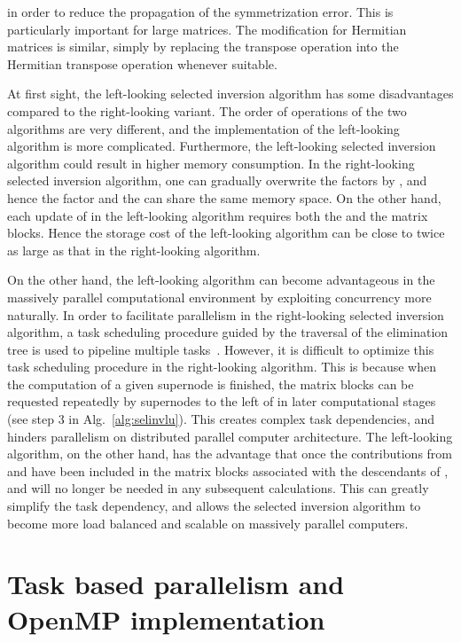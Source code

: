 \documentclass[10pt, conference, compsocconf,letterpaper,twocolumn]{IEEEtran}
\begin{document}
in order to reduce the propagation of the symmetrization error. This is
particularly important for large matrices. The modification for
Hermitian matrices is similar, simply by replacing the transpose
operation into the Hermitian transpose operation whenever suitable.

At first sight, 
the left-looking selected inversion algorithm has some disadvantages compared to the right-looking variant. 
The order of operations of the two algorithms are very different, and the implementation of the left-looking algorithm is  more complicated.  Furthermore, the left-looking selected inversion algorithm could result in higher memory consumption. In the right-looking selected inversion algorithm, one can gradually overwrite the  factors by , and hence the  factor and the  can share the same memory space. On the other hand, each update of  in the left-looking algorithm requires both the  and the  matrix blocks. Hence the storage cost of the left-looking algorithm can be close to twice as large as that in the right-looking algorithm.

On the other hand, the left-looking algorithm can become advantageous in the massively parallel computational environment by exploiting concurrency more naturally. In order to facilitate parallelism in the right-looking selected inversion algorithm, a task scheduling procedure guided by the traversal of the elimination tree is used to pipeline multiple tasks~\cite{JacquelinLinYang2015}. However, it is difficult to optimize this task scheduling procedure in the right-looking algorithm. This is because when the computation of a given supernode  is finished, the matrix blocks  can be requested repeatedly by supernodes to the left of  in later computational stages (see step 3 in Alg.~\ref{alg:selinvlu}). 
This creates complex task dependencies, and hinders parallelism on distributed parallel computer architecture. The left-looking algorithm, on the other hand, has the advantage that once the contributions from 
 and  have been included in the matrix blocks associated with the descendants of ,
 and  will no longer be needed in any  subsequent calculations. This can greatly simplify the task dependency, and allows the selected inversion algorithm to become more load balanced and scalable on massively parallel computers.









\section{Task based parallelism and OpenMP implementation}
\label{sec:parallel}
\end{document}
